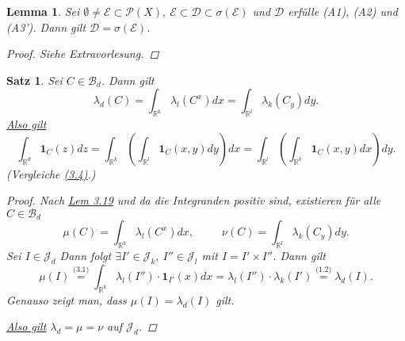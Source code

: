 \documentclass[a4paper]{report}
\newcommand{\PowerSet}{\mathcal{P}}
\newcommand{\doubleOne}{\textbf{1}}
\newcommand{\R}{\mathbb{R}}
\newcommand{\Borel}{\mathcal{B}}
\newcommand{\Bd}{\Borel_d}
\newcommand{\Jd}{\mathcal{J}_d}
\newcommand{\jlabel}[1]{\label{j_#1}}
\newcommand{\jshortlink}[1]{\jhyperref{#1}{\text{#1}}}
\newcommand{\jhyperref}[2]{\hyperref[j_#1]{#2}}
\newcommand{\jlink}[1]{\jhyperref{#1}{#1}}
\newcommand{\jspacesmall}{\vspace{4pt}}
\theoremstyle{plain}
\newtheorem{lem}[thm]{Lemma}
\newtheorem{satz}[thm]{Satz}
\theoremstyle{definition}
\begin{document}
{{{{\begin{lem}
\jlabel{Lem 3.20}
    Sei $\emptyset \ne \mathcal{E} \subset \PowerSet(X), \ \mathcal{E} \subset \mathcal{D} \subset \sigma(\mathcal{E})$ und $\mathcal{D}$ erfülle (A1), (A2) und (A3'). Dann gilt $\mathcal{D} = \sigma(\mathcal{E})$.
    \begin{proof}
        Siehe Extravorlesung.
    \end{proof}
\end{lem}

\begin{satz}
\jlabel{Satz 3.21}
    Sei $C\in \Bd$. Dann gilt
    \begin{displaymath}
        \lambda_d(C) = \int_{\R^k} \lambda_l(C^x)dx = \int_{\R^l} \lambda_k(C_y)dy.
    \end{displaymath}
    \uline{Also gilt}
    \begin{displaymath}
        \int_{\R^d} \doubleOne_C (z)dz = \int_{\R^k} \left( \int_{\R^l} \doubleOne_C(x,y)dy \right)dx = \int_{\R^l} \left(\int_{\R^k} \doubleOne_C(x,y)dx \right) dy.
    \end{displaymath}
    (Vergleiche \jlink{(3.4)}.)
    \begin{proof}
        Nach \jlink{Lem 3.19} und da die Integranden positiv sind, existieren für alle $C\in \Bd$
        \begin{displaymath}
            \mu(C) = \int_{\R^k} \lambda_l(C^x)dx, \hspace{30pt} \nu(C) = \int_{\R^l} \lambda_k(C_y)dy.
        \end{displaymath}
        Sei $I \in \Jd$ Dann folgt $\exists I' \in \mathcal{J}_k, \ I'' \in \mathcal{J}_l$ mit $I=I'\times I''$. Dann gilt
        \begin{displaymath}
            \mu(I) \overset{\jshortlink{(3.1)}}{=} \int_{\R^k} \lambda_l(I'') \cdot \doubleOne_{I'}(x) dx = \lambda_l(I'')\cdot \lambda_k(I') \overset{\jshortlink{(1.2)}}{=} \lambda_d(I).
        \end{displaymath}
        Genauso zeigt man, dass $\mu(I) = \lambda_d(I)$ gilt.
        
        \jspacesmall
        
        \uline{Also gilt} $\lambda_d = \mu = \nu$ auf $\Jd$.
        
        \jspacesmall
        

\end{proof}
\end{satz}}}}}
\end{document}
